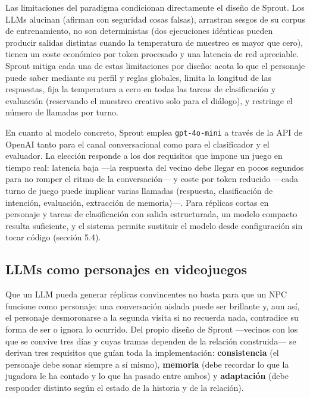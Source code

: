 \documentclass[12pt,twoside,titlepage]{report}
\begin{document}
Las limitaciones del paradigma condicionan directamente el diseño de Sprout. Los LLMs alucinan (afirman con seguridad cosas falsas), arrastran sesgos de su corpus de entrenamiento, no son deterministas (dos ejecuciones idénticas pueden producir salidas distintas cuando la temperatura de muestreo es mayor que cero), tienen un coste económico por token procesado y una latencia de red apreciable. Sprout mitiga cada una de estas limitaciones por diseño: acota lo que el personaje puede saber mediante su perfil y reglas globales, limita la longitud de las respuestas, fija la temperatura a cero en todas las tareas de clasificación y evaluación (reservando el muestreo creativo solo para el diálogo), y restringe el número de llamadas por turno.

En cuanto al modelo concreto, Sprout emplea \texttt{gpt-4o-mini} a través de la API de OpenAI tanto para el canal conversacional como para el clasificador y el evaluador. La elección responde a los dos requisitos que impone un juego en tiempo real: latencia baja ---la respuesta del vecino debe llegar en pocos segundos para no romper el ritmo de la conversación--- y coste por token reducido ---cada turno de juego puede implicar varias llamadas (respuesta, clasificación de intención, evaluación, extracción de memoria)---. Para réplicas cortas en personaje y tareas de clasificación con salida estructurada, un modelo compacto resulta suficiente, y el sistema permite sustituir el modelo desde configuración sin tocar código (sección 5.4).

\subsection{LLMs como personajes en videojuegos}

Que un LLM pueda generar réplicas convincentes no basta para que un NPC funcione como personaje: una conversación aislada puede ser brillante y, aun así, el personaje desmoronarse a la segunda visita si no recuerda nada, contradice su forma de ser o ignora lo ocurrido. Del propio diseño de Sprout ---vecinos con los que se convive tres días y cuyas tramas dependen de la relación construida--- se derivan tres requisitos que guían toda la implementación: \textbf{consistencia} (el personaje debe sonar siempre a sí mismo), \textbf{memoria} (debe recordar lo que la jugadora le ha contado y lo que ha pasado entre ambos) y \textbf{adaptación} (debe responder distinto según el estado de la historia y de la relación).
\end{document}
